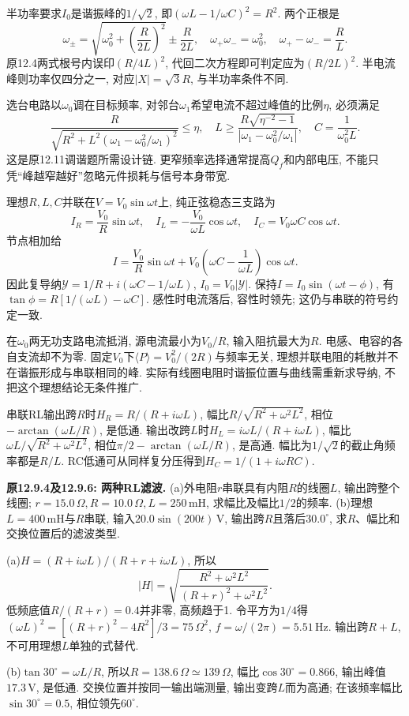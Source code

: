 半功率要求$I_0$是谐振峰的$1/\sqrt2$, 即$(\omega L-1/\omega C)^2=R^2$. 两个正根是
\[\omega_\pm=\sqrt{\omega_0^2+\left(\frac R{2L}\right)^2}\pm\frac R{2L},\quad
\omega_+\omega_-=\omega_0^2,\quad \omega_+-\omega_-=\frac RL.\]
原12.4两式根号内误印$(R/4L)^2$, 代回二次方程即可判定应为$(R/2L)^2$. 半电流峰则功率仅四分之一, 对应$|X|=\sqrt3R$, 与半功率条件不同.

选台电路以$\omega_0$调在目标频率, 对邻台$\omega_1$希望电流不超过峰值的比例$\eta$, 必须满足
\[\frac{R}{\sqrt{R^2+L^2(\omega_1-\omega_0^2/\omega_1)^2}}\le\eta,
\quad L\ge\frac{R\sqrt{\eta^{-2}-1}}{|\omega_1-\omega_0^2/\omega_1|},\quad C=\frac1{\omega_0^2L}.\]
这是原12.11调谐题所需设计链. 更窄频率选择通常提高$Q_f$和内部电压, 不能只凭“峰越窄越好”忽略元件损耗与信号本身带宽.

\label{tb:parallel-rlc}
理想$R,L,C$并联在$V=V_0\sin\omega t$上, 纯正弦稳态三支路为
\[I_R=\frac{V_0}R\sin\omega t,\quad
I_L=-\frac{V_0}{\omega L}\cos\omega t,\quad
I_C=V_0\omega C\cos\omega t.\]
节点相加给
\[I=\frac{V_0}R\sin\omega t+V_0\left(\omega C-\frac1{\omega L}\right)\cos\omega t.\]
因此复导纳$\mathcal Y=1/R+i(\omega C-1/\omega L)$, $I_0=V_0|\mathcal Y|$. 保持$I=I_0\sin(\omega t-\phi)$, 有$\tan\phi=R[1/(\omega L)-\omega C]$. 感性时电流落后, 容性时领先; 这仍与串联的符号约定一致.

在$\omega_0$两无功支路电流抵消, 源电流最小为$V_0/R$, 输入阻抗最大为$R$. 电感、电容的各自支流却不为零. 固定$V_0$下$\langle P\rangle=V_0^2/(2R)$与频率无关, 理想并联电阻的耗散并不在谐振形成与串联相同的峰. 实际有线圈电阻时谐振位置与曲线需重新求导纳, 不把这个理想结论无条件推广.

\label{tb:ac-filters}
串联RL输出跨$R$时$H_R=R/(R+i\omega L)$, 幅比$R/\sqrt{R^2+\omega^2L^2}$, 相位$-\arctan(\omega L/R)$, 是低通. 输出改跨$L$时$H_L=i\omega L/(R+i\omega L)$, 幅比$\omega L/\sqrt{R^2+\omega^2L^2}$, 相位$\pi/2-\arctan(\omega L/R)$, 是高通. 幅比为$1/\sqrt2$的截止角频率都是$R/L$. RC低通可从同样复分压得到$H_C=1/(1+i\omega RC)$.

\begin{example}
\textbf{原12.9.4及12.9.6: 两种RL滤波.} (a)外电阻$r$串联具有内阻$R$的线圈$L$, 输出跨整个线圈; $r=15.0\,\Omega,R=10.0\,\Omega,L=250\,\mathrm{mH}$, 求幅比及幅比$1/2$的频率. (b)理想$L=400\,\mathrm{mH}$与$R$串联, 输入$20.0\sin(200t)\,\mathrm V$, 输出跨$R$且落后$30.0^\circ$, 求$R$、幅比和交换位置后的滤波类型.
\end{example}
\begin{solution}
(a)$H=(R+i\omega L)/(R+r+i\omega L)$, 所以
\[|H|=\sqrt{\frac{R^2+\omega^2L^2}{(R+r)^2+\omega^2L^2}}.\]
低频底值$R/(R+r)=0.4$并非零, 高频趋于1. 令平方为$1/4$得$(\omega L)^2=[(R+r)^2-4R^2]/3=75\,\Omega^2$, $f=\omega/(2\pi)=5.51\,\mathrm{Hz}$. 输出跨$R+L$, 不可用理想$L$单独的式替代.

(b)$\tan30^\circ=\omega L/R$, 所以$R=138.6\,\Omega\simeq139\,\Omega$, 幅比$\cos30^\circ=0.866$, 输出峰值$17.3\,\mathrm V$, 是低通. 交换位置并按同一输出端测量, 输出变跨$L$而为高通; 在该频率幅比$\sin30^\circ=0.5$, 相位领先$60^\circ$.
\end{solution}

